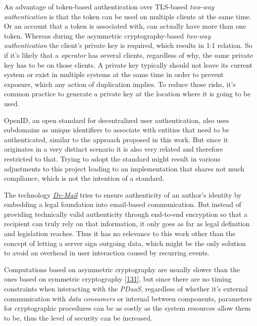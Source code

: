 \documentclass[12pt,english,a4paper,titlepage,cleardoublepage=empty,dottedtoc]{report}
\begin{document}
An advantage of token-based authentication over TLS-based \emph{two-way
authentication} is that the token can be used on multiple clients at the
same time. Or an account that a token is associated with, can actually
have more than one token. Whereas during the asymmetric
cryptography-based \emph{two-way authentication} the client's private
key is required, which results in 1:1 relation. So if it's likely that a
\emph{operator} has several clients, regardless of why, the same private
key has to be on those clients. A private key typically should not leave
its current system or exist in multiple systems at the same time in
order to prevent exposure, which any action of duplication implies. To
reduce those risks, it's common practice to generate a private key at
the location where it is going to be used.

OpenID, an open standard for decentralized user authentication, also
uses subdomains as unique identifiers to associate with entities that
need to be authenticated, similar to the approach proposed in this work.
But since it originates in a very distinct scenario it is also very
related and therefore restricted to that. Trying to adopt the standard
might result in various adjustments to this project leading to an
implementation that shares not much compliance, which is not the
intention of a standard.

The technology \emph{\protect\hyperlink{def--de-mail}{De-Mail}} tries to
ensure authenticity of an author's identity by embedding a legal
foundation into email-based communication. But instead of providing
technically valid authenticity through end-to-end encryption so that a
recipient can truly rely on that information, it only goes as far as
legal definition and legislation reaches. Thus it has no relevance to
this work other than the concept of letting a server sign outgoing data,
which might be the only solution to avoid an overhead in user
interaction caused by recurring events.

Computations based on asymmetric cryptography are usually slower than
the ones based on symmetric cryptography
{[}\protect\hyperlink{ref-book_2014_chapter-10-5-asym-random-number-gen}{131}{]},
but since there are no timing constraints when interacting with the
\emph{PDaaS}, regardless of whether it's external communication with
\emph{data consumers} or internal between components, parameters for
cryptographic procedures can be as costly as the system resources allow
them to be, thus the level of security can be increased.
\end{document}
